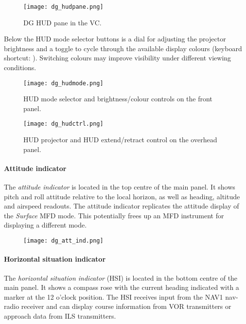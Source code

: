 \documentclass[Orbiter User Manual.tex]{subfiles}
\begin{document}
\begin{figure}[H]
  \centering
  \texttt{[image: dg\_hudpane.png]}
  \caption{DG HUD pane in the VC.}
\end{figure}

\noindent
Below the HUD mode selector buttons is a dial for adjusting the projector brightness and a toggle to cycle through the available display colours (keyboard shortcut: \Alt{}). Switching colours may improve visibility under different viewing conditions.

\begin{figure}[H]
  \centering
  \texttt{[image: dg\_hudmode.png]}
  \caption{HUD mode selector and brightness/colour controls on the front panel.}
\end{figure}


\begin{figure}[H]
  \centering
  \texttt{[image: dg\_hudctrl.png]}
  \caption{HUD projector and HUD extend/retract control on the overhead panel.}
\end{figure}


\paragraph{Attitude indicator}
The \textit{attitude indicator} is located in the top centre of the main panel. It shows pitch and roll attitude relative to the local horizon, as well as heading, altitude and airspeed readouts. The attitude indicator replicates the attitude display of the \textit{Surface} MFD mode. This potentially frees up an MFD instrument for displaying a different mode.

\begin{figure}[H]
  \centering
  \texttt{[image: dg\_att\_ind.png]}
\end{figure}

\paragraph{Horizontal situation indicator}
The \textit{horizontal situation indicator} (HSI) is located in the bottom centre of the main panel. It shows a compass rose with the current heading indicated with a marker at the 12 o'clock position. The HSI receives input from the NAV1 nav-radio receiver and can display course information from VOR transmitters or approach data from ILS transmitters.
\end{document}

